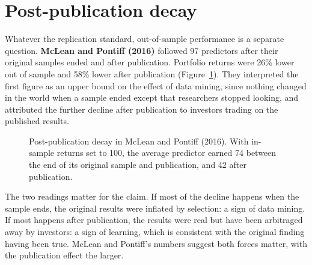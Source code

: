 \section{Post-publication decay}
\label{sec:07-decay}

Whatever the replication standard, out-of-sample performance is a separate question. \textbf{McLean and Pontiff (2016)} followed 97 predictors after their original samples ended and after publication. Portfolio returns were 26\% lower out of sample and 58\% lower after publication (Figure~\ref{fig:07-decay}). They interpreted the first figure as an upper bound on the effect of data mining, since nothing changed in the world when a sample ended except that researchers stopped looking, and attributed the further decline after publication to investors trading on the published results.

\begin{figure}[htbp]
\centering
{}
\caption{Post-publication decay in McLean and Pontiff (2016). With in-sample returns set to 100, the average predictor earned 74 between the end of its original sample and publication, and 42 after publication.}
\label{fig:07-decay}
\end{figure}

The two readings matter for the claim. If most of the decline happens when the sample ends, the original results were inflated by selection: a sign of data mining. If most happens after publication, the results were real but have been arbitraged away by investors: a sign of learning, which is consistent with the original finding having been true. McLean and Pontiff's numbers suggest both forces matter, with the publication effect the larger.

